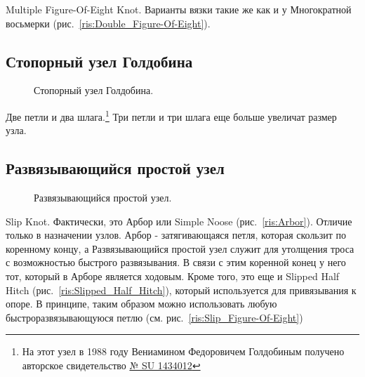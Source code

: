 Multiple Figure-Of-Eight Knot. Варианты вязки такие же как и у Многократной восьмерки (рис.~\ref{ris:Double_Figure-Of-Eight}).

\subsection{Стопорный узел Голдобина}

\begin{figure}[H]\centering
	\begin{minipage}{1\linewidth}
		\begin{center}
			\tcbox[enhanced jigsaw,colframe=black,opacityframe=0.5,opacityback=0.5]
			{\centering{}}
		\end{center}
	\end{minipage}
\caption{Стопорный узел Голдобина.}
	\label{ris:Goldobin}
\end{figure}


Две петли и два шлага.\footnote{На этот узел в 1988 году Вениамином Федоровичем Голдобиным получено авторское свидетельство \href{http://patents.su/2-1434012-stopornyjj-uzel-goldobina.html}{№ SU 1434012}} Три петли и три шлага еще больше увеличат размер узла.

\subsection{Развязывающийся простой узел}

\begin{figure}[H]\centering
	\begin{minipage}{1\linewidth}
		\begin{center}
			\tcbox[enhanced jigsaw,colframe=black,opacityframe=0.5,opacityback=0.5]
			{\centering{}}
		\end{center}
	\end{minipage}
\caption{Развязывающийся простой узел.}
	\label{ris:Slip_Knot}
\end{figure}

Slip Knot. Фактически, это Арбор или Simple Noose (рис.~\ref{ris:Arbor}). Отличие только в назначении узлов. Арбор - затягивающаяся петля, которая скользит по коренному концу, а Развязывающийся простой узел служит для утолщения троса с возможностью быстрого развязывания. В связи с этим коренной конец у него тот, который в Арборе является ходовым. Кроме того, это еще и Slipped Half Hitch (рис.~\ref{ris:Slipped_Half_Hitch}), который используется для привязывания к опоре. В принципе, таким образом можно использовать любую быстроразвязывающуюся петлю (см. рис.~\ref{ris:Slip_Figure-Of-Eight})


